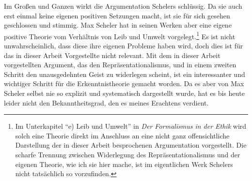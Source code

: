 \documentclass[a4paper, 12pt]{article}
\begin{document}
\begin{onehalfspace}
Im Großen und Ganzen wirkt die Argumentation Schelers schlüssig. Da sie auch erst einmal keine eigenen positiven Setzungen macht, ist sie für sich gesehen geschlossen und stimmig. Max Scheler hat in seinen Werken aber eine eigene positive Theorie vom Verhältnis von Leib und Umwelt vorgelegt.\footnote{Im Unterkapitel "`e) Leib und Umwelt"' in \emph{Der Formalismus in der Ethik} \citep[Vgl.][S. 489 bis 510]{scheler-ethik} wird solch eine Theorie direkt im Anschluss an eine nicht ganz offensichtliche Darstellung der in dieser Arbeit besprochenen Argumentation vorgestellt. Die scharfe Trennung zwischen Widerlegung des Repräsentationalismus und der eigenen Theorie, wie ich sie hier mache, ist im eigentlichen Werk Schelers nicht tatsächlich so vorzufinden.} Es ist nicht unwahrscheinlich, dass diese ihre eigenen Probleme haben wird, doch dies ist für das in dieser Arbeit Vorgestellte nicht relevant. Mit dem in dieser Arbeit vorgestellten Argument, das den Repräsentationalismus, und in einem zweiten Schritt den unausgedehnten Geist zu widerlegen scheint, ist ein interessanter und wichtiger Schritt für die Erkenntnistheorie gemacht worden. Da es aber von Max Scheler selbst nie so explizit und systematisch dargestellt wurde, hat es bis heute leider nicht den Bekanntheitsgrad, den es meines Erachtens verdient.









\end{onehalfspace}
\end{document}
